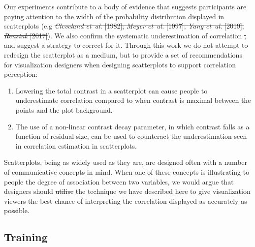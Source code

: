 \documentclass[preprint, 3p,
authoryear]{elsarticle} %
\newcommand{\ldiffentity}[1]{#1}
\providecommand{\DIFaddtex}[1]{{\protect\color{blue}\uwave{#1}}} %
\providecommand{\DIFdeltex}[1]{{\protect\color{red}\sout{#1}}}                      %
\providecommand{\DIFaddbegin}{} %
\providecommand{\DIFaddend}{} %
\providecommand{\DIFdelbegin}{} %
\providecommand{\DIFdelend}{} %
\providecommand{\DIFadd}[1]{\texorpdfstring{\DIFaddtex{#1}}{#1}} %
\providecommand{\DIFdel}[1]{\texorpdfstring{\DIFdeltex{#1}}{}} %
\newcommand{\DIFscaledelfig}{0.5}
\newlength{\DIFdelgraphicswidth} %
\newlength{\DIFdelgraphicsheight} %
\newcommand{\DIFaddincludegraphics}[2][]{{\color{blue}\fbox{\DIFOincludegraphics[#1]{#2}}}} %
\newcommand{\DIFdelincludegraphics}[2][]{%
\sbox{\DIFdelgraphicsbox}{\DIFOincludegraphics[#1]{#2}}%
\settoboxwidth{\DIFdelgraphicswidth}{\DIFdelgraphicsbox} %
\settoboxtotalheight{\DIFdelgraphicsheight}{\DIFdelgraphicsbox} %
\scalebox{\DIFscaledelfig}{%
\parbox[b]{\DIFdelgraphicswidth}{\usebox{\DIFdelgraphicsbox}\\[-\baselineskip] \rule{\DIFdelgraphicswidth}{0em}}\llap{\resizebox{\DIFdelgraphicswidth}{\DIFdelgraphicsheight}{%
\setlength{\unitlength}{\DIFdelgraphicswidth}%
\begin{picture}(1,1)%
\thicklines\linethickness{2pt} %
{\color[rgb]{1,0,0}\put(0,0){\framebox(1,1){}}}%
{\color[rgb]{1,0,0}\put(0,0){\line( 1,1){1}}}%
{\color[rgb]{1,0,0}\put(0,1){\line(1,-1){1}}}%
\end{picture}%
}\hspace*{3pt}}} %
} %
\DeclareRobustCommand{\DIFaddbegin}{\DIFOaddbegin \let\includegraphics\DIFaddincludegraphics} %
\DeclareRobustCommand{\DIFaddend}{\DIFOaddend \let\includegraphics\DIFOincludegraphics} %
\DeclareRobustCommand{\DIFdelbegin}{\DIFOdelbegin \let\includegraphics\DIFdelincludegraphics} %
\DeclareRobustCommand{\DIFdelend}{\DIFOaddend \let\includegraphics\DIFOincludegraphics} %
\begin{document}
\DIFaddend Our experiments contribute to a body of evidence that suggests
participants are paying attention to the width of the probability
distribution displayed in scatterplots (e.g \DIFdelbegin \DIFdel{\ldiffentity{\textit{Cleveland et~al.} [\ldiffentity{1982}]};
\ldiffentity{\textit{Meyer et~al.} [\ldiffentity{1997}]}; \ldiffentity{\textit{Yang et~al.} [\ldiffentity{2019}]}; \ldiffentity{\textit{Rensink} [\ldiffentity{2017}]}}\DIFdelend \DIFaddbegin \DIFadd{\mbox{%
\citealp{cleveland_1982}}\hskip0pt%
;
\mbox{%
\citealp{meyer_1997}}\hskip0pt%
; \mbox{%
\citealp{yang_2019}}\hskip0pt%
; \mbox{%
\citealp{rensink_2017}}\hskip0pt%
}\DIFaddend ). We
also confirm the systematic underestimation of correlation \DIFdelbegin \DIFdel{, }\DIFdelend and suggest a
strategy to correct for it. Through this work we do not attempt to
redesign the scatterplot as a medium, but to provide a set of
recommendations for visualization designers when designing scatterplots
to support correlation perception:

\begin{enumerate}
\def\labelenumi{\arabic{enumi}.}
\item
  Lowering the total contrast in a scatterplot can cause people to
  underestimate correlation compared to when contrast is maximal between
  the points and the plot background.
\item
  The use of a non-linear contrast decay parameter, in which contrast
  falls as a function of residual size, can be used to counteract the
  underestimation seen in correlation estimation in scatterplots.
\end{enumerate}

Scatterplots, being as widely used as they are, are designed often with
a number of communicative concepts in mind. When one of these concepts
is illustrating to people the degree of association between two
variables, we would argue that designers should \DIFdelbegin \DIFdel{utilise }\DIFdelend \DIFaddbegin \DIFadd{utilize }\DIFaddend the technique we
have described here to give visualization viewers the best chance of
interpreting the correlation displayed as accurately as possible.

\DIFaddbegin \hypertarget{training}{%
\subsection{Training}\label{training}}
\end{document}
